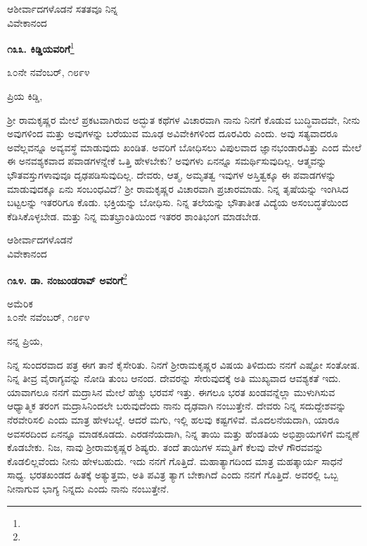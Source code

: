 {\flushright
ಆಶೀರ್ವಾದಗಳೊಡನೆ ಸತತವೂ ನಿನ್ನ\\ವಿವೇಕಾನಂದ\par}

\begin{center}
\textbf{೧೩೩. ಕಿಡ್ಡಿಯವರಿಗೆ}\footnote{}
\end{center}
\vspace{-0.3cm}

\begin{flushright}
೩೦ನೇ ನವೆಂಬರ್, ೧೮೯೪
\end{flushright}
\vspace{-0.3cm}

\noindent
ಪ್ರಿಯ ಕಿಡ್ಡಿ,

ಶ‍್ರೀ ರಾಮಕೃಷ್ಣರ ಮೇಲೆ ಪ್ರಕಟವಾಗಿರುವ ಅದ್ಭುತ ಕಥೆಗಳ ವಿಚಾರವಾಗಿ ನಾನು ನಿನಗೆ ಕೊಡುವ ಬುದ್ಧಿವಾದವೇ, ನೀನು ಅವುಗಳಿಂದ ಮತ್ತು ಅವುಗಳನ್ನು ಬರೆಯುವ ಮೂಢ ಅವಿವೇಕಿಗಳಿಂದ ದೂರವಿರು ಎಂದು. ಅವು ಸತ್ಯವಾದರೂ ಅವೆಲ್ಲವನ್ನೂ ಅವ್ಯವಸ್ಥೆ ಮಾಡುವುದು ಖಂಡಿತ. ಅವರಿಗೆ ಬೋಧಿಸಲು ವಿಪುಲವಾದ ಜ್ಞಾನಭಂಡಾರವಿತ್ತು ಎಂದ ಮೇಲೆ ಈ ಅನವಶ್ಯಕವಾದ ಪವಾಡಗಳನ್ನೇಕೆ ಒತ್ತಿ ಹೇಳಬೇಕು? ಅವುಗಳು ಏನನ್ನೂ ಸಮರ್ಥಿಸುವುದಿಲ್ಲ. ಆತ್ಮವನ್ನು ಭೌತವಸ್ತುಗಳಾವುವೂ ದೃಢಪಡಿಸುವುದಿಲ್ಲ. ದೇವರು, ಆತ್ಮ, ಅಮೃತತ್ವ ಇವುಗಳ ಅಸ್ತಿತ್ವಕ್ಕೂ ಈ ಪವಾಡಗಳನ್ನು ಮಾಡುವುದಕ್ಕೂ ಏನು ಸಂಬಂಧವಿದೆ? ಶ‍್ರೀ ರಾಮಕೃಷ್ಣರ ವಿಚಾರವಾಗಿ ಪ್ರಚಾರಮಾಡು. ನಿನ್ನ ತೃಷೆಯನ್ನು ಇಂಗಿಸಿದ ಬಟ್ಟಲನ್ನು ಇತರರಿಗೂ ಕೊಡು. ಭಕ್ತಿಯನ್ನು ಬೋಧಿಸು. ನಿನ್ನ ತಲೆಯನ್ನು ಭೌತಾತೀತ ವಿದ್ಯೆಯ ಅಸಂಬದ್ಧತೆಯಿಂದ ಕೆಡಿಸಿಕೊಳ್ಳಬೇಡ. ಮತ್ತು ನಿನ್ನ ಮತಭ್ರಾಂತಿಯಿಂದ ಇತರರ ಶಾಂತಿಭಂಗ ಮಾಡಬೇಡ.

{\flushright
ಆಶೀರ್ವಾದಗಳೊಡನೆ\\ವಿವೇಕಾನಂದ\par}

\begin{center}
\textbf{೧೩೪. ಡಾ. ನಂಜುಂಡರಾವ್ ಅವರಿಗೆ}\footnote{}
\end{center}

\begin{flushright}
ಅಮೆರಿಕ\\೩೦ನೇ ನವೆಂಬರ್, ೧೮೯೪
\end{flushright}

\noindent
ನನ್ನ ಪ್ರಿಯ,

ನಿನ್ನ ಸುಂದರವಾದ ಪತ್ರ ಈಗ ತಾನೆ ಕೈಸೇರಿತು. ನಿನಗೆ ಶ‍್ರೀರಾಮಕೃಷ್ಣರ ವಿಷಯ ತಿಳಿದುದು ನನಗೆ ಎಷ್ಟೋ ಸಂತೋಷ. ನಿನ್ನ ತೀವ್ರ ವೈರಾಗ್ಯವನ್ನು ನೋಡಿ ತುಂಬ ಆನಂದ. ದೇವರನ್ನು ಸೇರುವುದಕ್ಕೆ ಅತಿ ಮುಖ್ಯವಾದ ಆವಶ್ಯಕತೆ ಇದು. ಯಾವಾಗಲೂ ನನಗೆ ಮದ್ರಾಸಿನ ಮೇಲೆ ಹೆಚ್ಚು ಭರವಸೆ ಇತ್ತು. ಈಗಲೂ ಭರತ ಖಂಡವನ್ನೆಲ್ಲಾ ಮುಳುಗಿಸುವ ಆಧ್ಯಾತ್ಮಿಕ ತರಂಗ ಮದ್ರಾಸಿನಿಂದಲೇ ಬರುವುದೆಂದು ನಾನು ದೃಢವಾಗಿ ನಂಬುತ್ತೇನೆ. ದೇವರು ನಿನ್ನ ಸದುದ್ದೇಶವನ್ನು ನೆರವೇರಿಸಲಿ ಎಂದು ಮಾತ್ರ ಹೇಳಬಲ್ಲೆ. ಆದರೆ ಮಗು, ಇಲ್ಲಿ ಹಲವು ಕಷ್ಟಗಳಿವೆ. ಮೊದಲನೆಯದಾಗಿ, ಯಾರೂ ಅವಸರದಿಂದ ಏನನ್ನೂ ಮಾಡಕೂಡದು. ಎರಡನೆಯದಾಗಿ, ನಿನ್ನ ತಾಯಿ ಮತ್ತು ಹೆಂಡತಿಯ ಅಭಿಪ್ರಾಯಗಳಿಗೆ ಮನ್ನಣೆ ಕೊಡಬೇಕು. ನಿಜ, ನಾವು ಶ‍್ರೀರಾಮಕೃಷ್ಣರ ಶಿಷ್ಯರು. ತಂದೆ ತಾಯಿಗಳ ಸಮ್ಮತಿಗೆ ಕೆಲವು ವೇಳೆ ಗೌರವವನ್ನು ಕೊಡಲಿಲ್ಲವೆಂದು ನೀನು ಹೇಳಬಹುದು. ಇದು ನನಗೆ ಗೊತ್ತಿದೆ. ಮಹಾತ್ಯಾಗದಿಂದ ಮಾತ್ರ ಮಹತ್ಕಾರ್ಯ ಸಾಧನೆ ಸಾಧ್ಯ. ಭರತಖಂಡದ ಹಿತಕ್ಕೆ ಅತ್ಯುತ್ತಮ, ಅತಿ ಪವಿತ್ರ ತ್ಯಾಗ ಬೇಕಾಗಿದೆ ಎಂದು ನನಗೆ ಗೊತ್ತಿದೆ. ಅವರಲ್ಲಿ ಒಬ್ಬ ನೀನಾಗುವ ಭಾಗ್ಯ ನಿನ್ನದು ಎಂದು ನಾನು ನಂಬುತ್ತೇನೆ.

